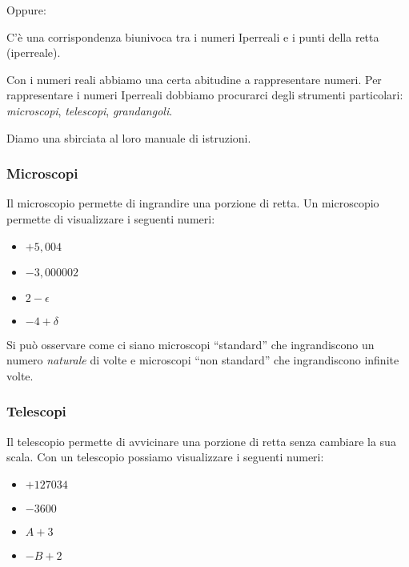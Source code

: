 Oppure:

\begin{postulato}
C'è una corrispondenza biunivoca tra i numeri Iperreali e 
i punti della retta (iperreale).
\end{postulato}

Con i numeri reali abbiamo una certa abitudine a rappresentare numeri.
Per rappresentare i numeri Iperreali dobbiamo procurarci degli strumenti 
particolari: \emph{microscopi}, \emph{telescopi}, \emph{grandangoli}.

Diamo una sbirciata al loro manuale di istruzioni.

\subsubsection{Microscopi}
\label{subsec:insnum_microscopio}

Il microscopio permette di ingrandire una porzione di retta. 
Un microscopio permette di visualizzare i seguenti numeri:

\begin{multicols}{4}
\begin{itemize}
 \item $+5,004$
 \item $-3,000002$
 \item $2-\epsilon$
 \item $-4+\delta$
\end{itemize}
\end{multicols}

Si può osservare come ci siano microscopi ``standard'' che ingrandiscono un 
numero \emph{naturale} di volte e microscopi ``non standard'' che ingrandiscono 
infinite volte.

\subsubsection{Telescopi}
\label{subsec:insnum_microscopio}

Il telescopio permette di avvicinare una porzione di retta senza cambiare la 
sua scala. 
Con un telescopio possiamo visualizzare i seguenti numeri:

\begin{multicols}{4}
\begin{itemize}
 \item $+127034$
 \item $-3600$
 \item $A+3$
 \item $-B+2$
\end{itemize}
\end{multicols}


